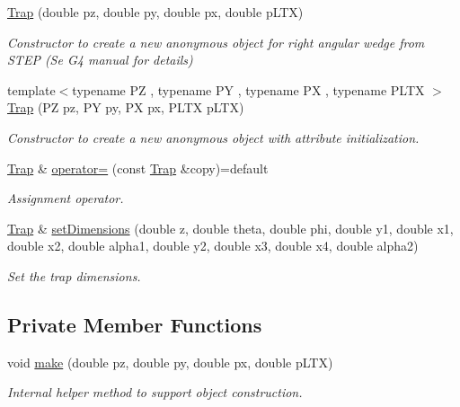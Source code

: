 \begin{DoxyCompactItemize}
\hyperlink{class_d_d4hep_1_1_geometry_1_1_trap_aaefea9c824b382d67d0b5d6b3fe3f62d}{Trap} (double pz, double py, double px, double p\+L\+TX)
\begin{DoxyCompactList}\small\item\em Constructor to create a new anonymous object for right angular wedge from S\+T\+EP (Se G4 manual for details) \end{DoxyCompactList}\item 
{\footnotesize template$<$typename PZ , typename PY , typename PX , typename P\+L\+TX $>$ }\\\hyperlink{class_d_d4hep_1_1_geometry_1_1_trap_a4382006678f47fd85576c9d9f52c50f8}{Trap} (PZ pz, PY py, PX px, P\+L\+TX p\+L\+TX)
\begin{DoxyCompactList}\small\item\em Constructor to create a new anonymous object with attribute initialization. \end{DoxyCompactList}\item 
\hyperlink{class_d_d4hep_1_1_geometry_1_1_trap}{Trap} \& \hyperlink{class_d_d4hep_1_1_geometry_1_1_trap_a82d15e0eeeda4326ca9a2a0c95b06761}{operator=} (const \hyperlink{class_d_d4hep_1_1_geometry_1_1_trap}{Trap} \&copy)=default
\begin{DoxyCompactList}\small\item\em Assignment operator. \end{DoxyCompactList}\item 
\hyperlink{class_d_d4hep_1_1_geometry_1_1_trap}{Trap} \& \hyperlink{class_d_d4hep_1_1_geometry_1_1_trap_a577c150f75380ee4b93ec1c339066561}{set\+Dimensions} (double z, double theta, double phi, double y1, double x1, double x2, double alpha1, double y2, double x3, double x4, double alpha2)
\begin{DoxyCompactList}\small\item\em Set the trap dimensions. \end{DoxyCompactList}\end{DoxyCompactItemize}
\subsection*{Private Member Functions}
\begin{DoxyCompactItemize}
\item 
void \hyperlink{class_d_d4hep_1_1_geometry_1_1_trap_a2dcf7eee64e3128d22a35d1b1f872cf9}{make} (double pz, double py, double px, double p\+L\+TX)
\begin{DoxyCompactList}\small\item\em Internal helper method to support object construction. \end{DoxyCompactList}\end{DoxyCompactItemize}
